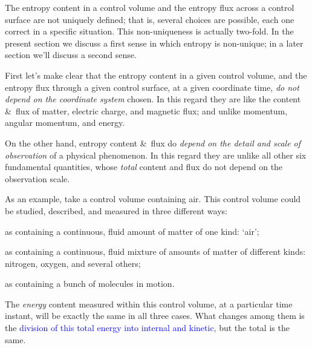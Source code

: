 \documentclass[a4paper,12pt,%
onecolumn,oneside,titlepage,%
british%
]{memoir}
\newcommand*{\amp}{\&}
\renewcommand*{\|}[1][]{\nonscript\:#1\vert\nonscript\:\mathopen{}}
\newcommand*{\sect}{\S}%
\renewcommand*{\autoref}[2]{\sidepar{\vspace{-1ex}\footnotesize{\color{blue}\faIcon{%
reply%
}\enspace\sect\,\ref{#1} page\,\pageref{#1}}}\textcolor{blue}{#2}}
\begin{document}
The entropy content in a control volume and the entropy flux across a control surface are not uniquely defined; that is, several choices are possible, each one correct in a specific situation. This non-uniqueness is actually two-fold. In the present section we discuss a first sense in which entropy is non-unique; in a later section we'll discuss a second sense.

First let's make clear that the entropy content in a given control volume, and the entropy flux through a given control surface, at a given coordinate time, \emph{do not depend on the coordinate system} chosen. In this regard they are like the content \amp\ flux of matter, electric charge, and magnetic flux; and unlike momentum, angular momentum, and energy.

On the other hand, entropy content \amp\ flux do \emph{depend on the detail and scale of observation} of a physical phenomenon. In this regard they are unlike all other six fundamental quantities, whose \emph{total} content and flux do not depend on the observation scale.

As an example, %
take a control volume containing air. This control volume could be studied, described, and measured in three different ways:
\begin{enumerate*}[label=(\alph*)]
\item as containing a continuous, fluid amount of matter of one kind: \enquote*{air}; \item as containing a continuous, fluid mixture of amounts of matter of different kinds: nitrogen, oxygen, and several others; \item as containing a bunch of molecules in motion.
\end{enumerate*}

The \emph{energy} content measured within this control volume, at a particular time instant, will be exactly the same in all three cases. What changes among them is the \autoref{sec:dependence_energycontentdivision}{division of this total energy into internal and kinetic}, but the total is the same.
\end{document}
